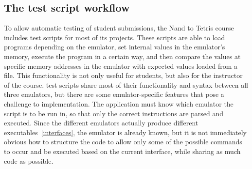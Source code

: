 \subsection{The test script workflow}
To allow automatic testing of student submissions, the Nand to Tetris course includes test scripts for most of its projects. These scripts are able to load programs depending on the emulator, set internal values in the emulator's memory, execute the program in a certain way, and then compare the values at specific memory addresses in the emulator with expected values loaded from a file.
This functionality is not only useful for students, but also for the instructor of the course.
test scripts share most of their functionality and syntax between all three emulators, but there are some emulator-specific features that pose a challenge to implementation.
The application must know which emulator the script is to be run in, so that only the correct instructions are parsed and executed.
Since the different emulators actually produce different executables~\ref{interfaces}, the emulator is already known, but it is not immediately obvious how to structure the code to allow only some of the possible commands to occur and be executed based on the current interface, while sharing as much code as possible.

